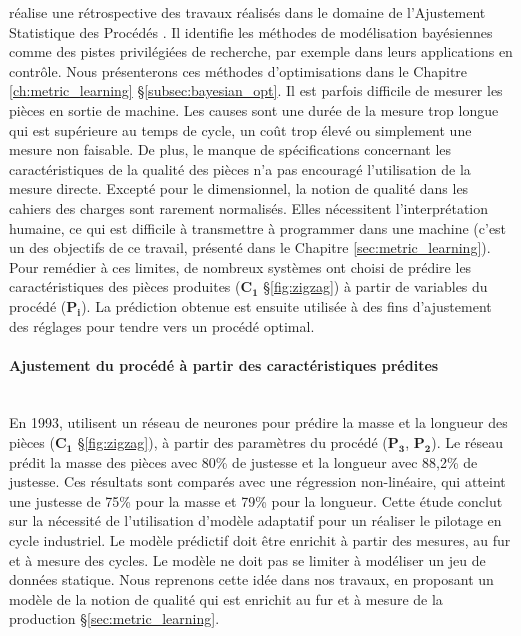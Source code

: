 \citeauthor{del_castillo_statistical_2006} réalise une rétrospective des travaux réalisés dans le domaine de l'Ajustement Statistique des Procédés \cite{del_castillo_statistical_2006}.
Il identifie les méthodes de modélisation bayésiennes comme des pistes privilégiées de recherche, par exemple dans leurs applications en contrôle.
Nous présenterons ces méthodes d'optimisations dans le Chapitre \ref{ch:metric_learning} §\ref{subsec:bayesian_opt}.
Il est parfois difficile de mesurer les pièces en sortie de machine.
Les causes sont une durée de la mesure trop longue qui est supérieure au temps de cycle, un coût trop élevé ou simplement une mesure non faisable.
De plus, le manque de spécifications concernant les caractéristiques de la qualité des pièces n’a pas encouragé l’utilisation de la mesure directe.
Excepté pour le dimensionnel, la notion de qualité dans les cahiers des charges sont rarement normalisés.
Elles nécessitent l'interprétation humaine, ce qui est difficile à transmettre à programmer dans une machine (c'est un des objectifs de ce travail, présenté dans le Chapitre \ref{sec:metric_learning}).
Pour remédier à ces limites, de nombreux systèmes ont choisi de prédire les caractéristiques des pièces produites ($\boldsymbol{C_1}$ §\ref{fig:zigzag}) à partir de variables du procédé ($\boldsymbol{P_i}$).
La prédiction obtenue est ensuite utilisée à des fins d’ajustement des réglages pour tendre vers un procédé optimal.

\paragraph{Ajustement du procédé à partir des caractéristiques prédites}\mbox{} \\
En 1993, \citeauthor{haeussler_quality_1993} \cite{haeussler_quality_1993} utilisent un réseau de neurones pour prédire la masse et la longueur des pièces ($\boldsymbol{C_1}$ §\ref{fig:zigzag}), à partir des paramètres du procédé ($\boldsymbol{P_3}$, $\boldsymbol{P_2}$).
Le réseau prédit la masse des pièces avec 80\% de justesse et la longueur avec 88,2\% de justesse.
Ces résultats sont comparés avec une régression non-linéaire, qui atteint une justesse de 75\% pour la masse et 79\% pour la longueur.
Cette étude conclut sur la nécessité de l'utilisation d'modèle adaptatif pour un réaliser le pilotage en cycle industriel.
Le modèle prédictif doit être enrichit à partir des mesures, au fur et à mesure des cycles.
Le modèle ne doit pas se limiter à modéliser un jeu de données statique.
Nous reprenons cette idée dans nos travaux, en proposant un modèle de la notion de qualité qui est enrichit au fur et à mesure de la production §\ref{sec:metric_learning}.

